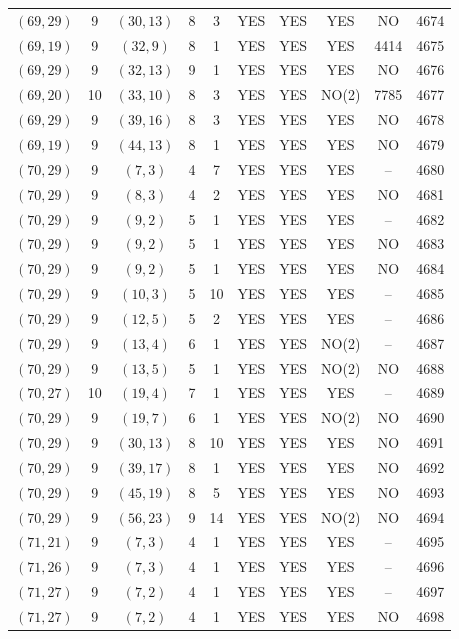 \begin{longtable}{|c|c|c|c|c|c|c|c|c|c|}
$(69, 29)$ & 9 & $(30, 13)$ & 8 & 3 & YES & YES & YES & NO & 4674\\
$(69, 19)$ & 9 & $(32, 9)$ & 8 & 1 & YES & YES & YES & 4414 & 4675\\
$(69, 29)$ & 9 & $(32, 13)$ & 9 & 1 & YES & YES & YES & NO & 4676\\
$(69, 20)$ & 10 & $(33, 10)$ & 8 & 3 & YES & YES & NO(2) & 7785 & 4677\\
$(69, 29)$ & 9 & $(39, 16)$ & 8 & 3 & YES & YES & YES & NO & 4678\\
$(69, 19)$ & 9 & $(44, 13)$ & 8 & 1 & YES & YES & YES & NO & 4679\\
$(70, 29)$ & 9 & $(7, 3)$ & 4 & 7 & YES & YES & YES & -- & 4680\\
$(70, 29)$ & 9 & $(8, 3)$ & 4 & 2 & YES & YES & YES & NO & 4681\\
$(70, 29)$ & 9 & $(9, 2)$ & 5 & 1 & YES & YES & YES & -- & 4682\\
$(70, 29)$ & 9 & $(9, 2)$ & 5 & 1 & YES & YES & YES & NO & 4683\\
$(70, 29)$ & 9 & $(9, 2)$ & 5 & 1 & YES & YES & YES & NO & 4684\\
$(70, 29)$ & 9 & $(10, 3)$ & 5 & 10 & YES & YES & YES & -- & 4685\\
$(70, 29)$ & 9 & $(12, 5)$ & 5 & 2 & YES & YES & YES & -- & 4686\\
$(70, 29)$ & 9 & $(13, 4)$ & 6 & 1 & YES & YES & NO(2) & -- & 4687\\
$(70, 29)$ & 9 & $(13, 5)$ & 5 & 1 & YES & YES & NO(2) & NO & 4688\\
$(70, 27)$ & 10 & $(19, 4)$ & 7 & 1 & YES & YES & YES & -- & 4689\\
$(70, 29)$ & 9 & $(19, 7)$ & 6 & 1 & YES & YES & NO(2) & NO & 4690\\
$(70, 29)$ & 9 & $(30, 13)$ & 8 & 10 & YES & YES & YES & NO & 4691\\
$(70, 29)$ & 9 & $(39, 17)$ & 8 & 1 & YES & YES & YES & NO & 4692\\
$(70, 29)$ & 9 & $(45, 19)$ & 8 & 5 & YES & YES & YES & NO & 4693\\
$(70, 29)$ & 9 & $(56, 23)$ & 9 & 14 & YES & YES & NO(2) & NO & 4694\\
$(71, 21)$ & 9 & $(7, 3)$ & 4 & 1 & YES & YES & YES & -- & 4695\\
$(71, 26)$ & 9 & $(7, 3)$ & 4 & 1 & YES & YES & YES & -- & 4696\\
$(71, 27)$ & 9 & $(7, 2)$ & 4 & 1 & YES & YES & YES & -- & 4697\\
$(71, 27)$ & 9 & $(7, 2)$ & 4 & 1 & YES & YES & YES & NO & 4698\\

\end{longtable}
